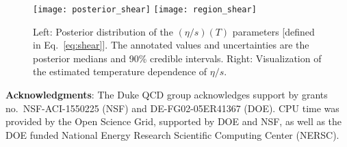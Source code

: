 \documentclass[3p,times,procedia,sort&compress]{elsarticle}
\begin{document}
\begin{figure}
  \texttt{[image: posterior\_shear]}
  \hfill
  \texttt{[image: region\_shear]}
  \caption{
    Left: Posterior distribution of the $(\eta/s)(T)$ parameters [defined in Eq.~\eqref{eq:shear}].
    The annotated values and uncertainties are the posterior medians and 90\% credible intervals.
    Right: Visualization of the estimated temperature dependence of $\eta/s$.
  }
  \label{fig:shear}
\end{figure}

\vspace{.5em}\noindent\textbf{Acknowledgments}:
The Duke QCD group acknowledges support by grants no.\ NSF-ACI-1550225 (NSF) and DE-FG02-05ER41367 (DOE).
CPU time was provided by the Open Science Grid, supported by DOE and NSF, as well as the DOE funded National Energy Research Scientific Computing Center (NERSC).



\end{document}
